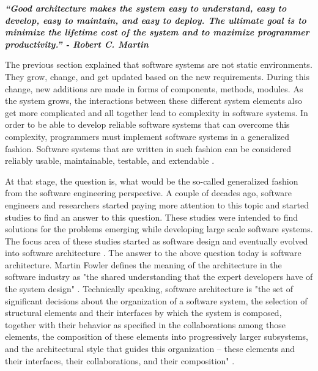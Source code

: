 \textbf{\textit{“Good architecture makes the system easy to understand, easy to develop, easy to maintain, and easy to deploy. The ultimate goal is to minimize the lifetime cost of the system and to maximize programmer productivity.” - Robert C. Martin}} \cite{10}

The previous section explained that software systems are not static environments. They grow, change, and get updated based on the new requirements. During this change, new additions are made in forms of components, methods, modules. As the system grows, the interactions between these different system elements also get more complicated and all together lead to complexity in software systems. In order to be able to develop reliable software systems that can overcome this complexity, programmers must implement software systems in a generalized fashion. Software systems that are written in such fashion can be considered reliably usable, maintainable, testable, and extendable \cite{15}. 

At that stage, the question is, what would be the so-called generalized fashion from the software engineering perspective. A couple of decades ago, software engineers and researchers started paying more attention to this topic and started studies to find an answer to this question. These studies were intended to find solutions for the problems emerging while developing large scale software systems. The focus area of these studies started as software design and eventually evolved into software architecture \cite{24}. The answer to the above question today is software architecture. Martin Fowler defines the meaning of the architecture in the software industry as "the shared understanding that the expert developers have of the system design" \cite{16}. Technically speaking, software architecture is "the set of significant decisions about the organization of a software system, the selection of structural elements and their interfaces by which the system is composed, together with their behavior as specified in the collaborations among those elements, the composition of these elements into progressively larger subsystems, and the architectural style that guides this organization -- these elements and their interfaces, their collaborations, and their composition" \cite{17}. 

